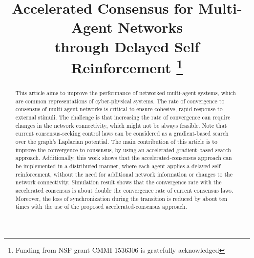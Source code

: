 \documentclass[conference]{IEEEtran}
\begin{document}
\title{Accelerated Consensus  for Multi-Agent Networks \\ through Delayed Self Reinforcement 
\thanks{Funding from NSF grant CMMI 1536306 is gratefully acknowledged}}


\author{
}




\maketitle
\thispagestyle{empty}
\pagestyle{empty}


\begin{abstract}
This article aims to improve the performance 
of networked multi-agent systems, which are common representations of 
cyber-physical systems. 
The rate of convergence to consensus  of multi-agent networks is critical to 
ensure cohesive, rapid response to external stimuli. 
The challenge is that increasing the rate of convergence 
can  require changes in the network connectivity, 
which might not be always feasible. 
Note that current consensus-seeking control laws can be considered as a gradient-based search over the graph's Laplacian potential. 
The main contribution 
of this article is to improve the convergence to consensus, 
by using an accelerated gradient-based search approach. 
Additionally, this work shows that  the 
accelerated-consensus approach can be implemented in a distributed 
manner, where each agent applies a delayed self reinforcement, 
without the need for additional network information or changes to the 
network connectivity. 
Simulation result shows that the convergence 
rate  with the accelerated consensus 
is about double the convergence rate of  current consensus laws. 
Moreover, the loss of synchronization during the transition 
is reduced by about ten times with the use of the proposed 
accelerated-consensus approach. 
\end{abstract}

\vspace{0.1in}
\end{document}
